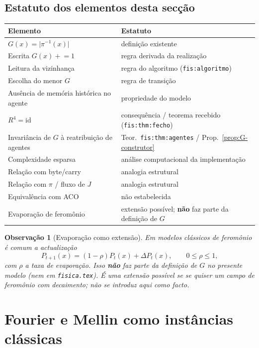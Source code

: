 \documentclass[11pt,a4paper]{article}
\newtheorem{observacao}{Observação}
\begin{document}
\subsection{Estatuto dos elementos desta secção}

\begin{center}
\small
\begin{tabular}{@{}p{}p{}@{}}
\toprule
Elemento & Estatuto \\
\midrule
\(G(x)=\lvert\pi^{-1}(x)\rvert\) & definição existente \\
Escrita \(G(x)\mathrel{+}=1\) & regra derivada da realização \\
Leitura da vizinhança & regra do algoritmo (\texttt{fis:algoritmo}) \\
Escolha do menor \(G\) & regra de transição \\
Ausência de memória histórica no agente & propriedade do modelo \\
\(R^4=\mathrm{id}\) & consequência / teorema recebido (\texttt{fis:thm:fecho}) \\
Invariância de \(G\) à reatribuição de agentes & Teor.\ \texttt{fis:thm:agentes} / Prop.~\ref{prop:G-construtor} \\
Complexidade esparsa & análise computacional da implementação \\
Relação com byte/carry & analogia estrutural \\
Relação com \(\pi\) / fluxo de \(J\) & analogia estrutural \\
Equivalência com ACO & não estabelecida \\
Evaporação de feromônio & extensão possível; \textbf{não} faz parte da definição de \(G\) \\
\bottomrule
\end{tabular}
\end{center}

\begin{observacao}[Evaporação como extensão]
Em modelos clássicos de feromônio é comum a actualização
\[
P_{t+1}(x)=(1-\rho)P_t(x)+\Delta P_t(x),\qquad 0\le\rho\le 1,
\]
com \(\rho\) a taxa de evaporação. Isso \textbf{não} faz parte da definição de \(G\) no presente modelo (nem em \texttt{fisica.tex}). É uma extensão possível se se quiser um campo de feromônio com decaimento; não se introduz aqui como facto.
\end{observacao}

\section{Fourier e Mellin como instâncias clássicas}
\end{document}
